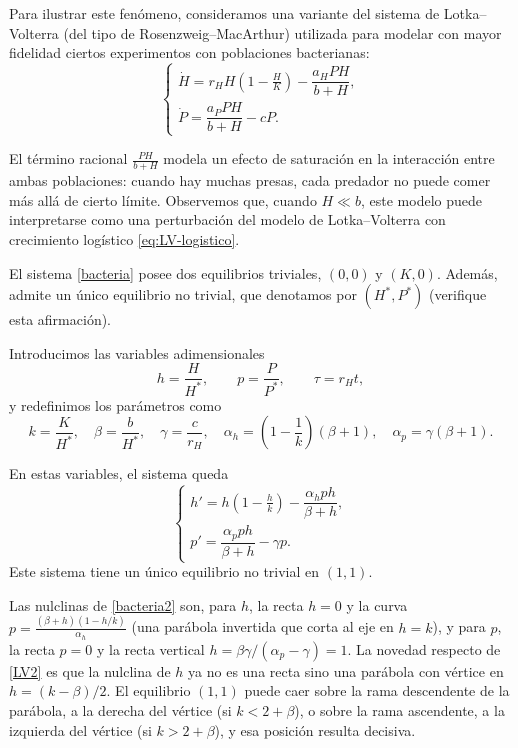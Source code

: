 \documentclass[12pt, a4paper]{amsbook}
\theoremstyle{remark}
\theoremstyle{definition}
\numberwithin{section}{chapter}
\numberwithin{subsection}{section}
\numberwithin{equation}{section}
\numberwithin{figure}{chapter}
\begin{document}
Para ilustrar este fenómeno, consideramos una variante del sistema de Lotka--Volterra (del tipo de Rosenzweig--MacArthur) utilizada para modelar con mayor fidelidad ciertos experimentos con poblaciones bacterianas:
\begin{equation}\label{bacteria}
\begin{cases}
\dot H = r_H H\left(1-\frac{H}{K}\right) - \dfrac{a_H PH}{b+H},\\[6pt]
\dot P = \dfrac{a_P PH}{b+H} - cP.
\end{cases}
\end{equation}

El término racional $\frac{PH}{b+H}$ modela un efecto de saturación en la interacción entre ambas poblaciones: cuando hay muchas presas, cada predador no puede comer más allá de cierto límite. Observemos que, cuando $H\ll b$, este modelo puede interpretarse como una perturbación del modelo de Lotka--Volterra con crecimiento logístico \eqref{eq:LV-logistico}.

El sistema \eqref{bacteria} posee dos equilibrios triviales, $(0,0)$ y $(K,0)$. Además, admite un único equilibrio no trivial, que denotamos por $(H^*,P^*)$ (verifique esta afirmación).

Introducimos las variables adimensionales
$$
h = \frac{H}{H^*},\qquad p = \frac{P}{P^*},\qquad \tau = r_H t,
$$
y redefinimos los parámetros como
$$
k = \frac{K}{H^*},\quad \beta = \frac{b}{H^*},\quad \gamma = \frac{c}{r_H},\quad
\alpha_h = \left(1-\frac{1}{k}\right)(\beta+1),\quad
\alpha_p = \gamma(\beta+1).
$$

En estas variables, el sistema queda
\begin{equation}\label{bacteria2}
\begin{cases}
h' = h\left(1-\frac{h}{k}\right) - \dfrac{\alpha_h ph}{\beta + h},\\[6pt]
p' = \dfrac{\alpha_p ph}{\beta + h} - \gamma p.
\end{cases}
\end{equation}
Este sistema tiene un único equilibrio no trivial en $(1,1)$.

Las nulclinas de \eqref{bacteria2} son, para $h$, la recta $h=0$ y la curva $p = \frac{(\beta+h)(1-h/k)}{\alpha_h}$ (una parábola invertida que corta al eje en $h=k$), y para $p$, la recta $p=0$ y la recta vertical $h=\beta\gamma/(\alpha_p-\gamma) = 1$. La novedad respecto de \eqref{LV2} es que la nulclina de $h$ ya no es una recta sino una parábola con vértice en $h = (k-\beta)/2$. El equilibrio $(1,1)$ puede caer sobre la rama descendente de la parábola, a la derecha del vértice (si $k<2+\beta$), o sobre la rama ascendente, a la izquierda del vértice (si $k>2+\beta$), y esa posición resulta decisiva.
\end{document}
